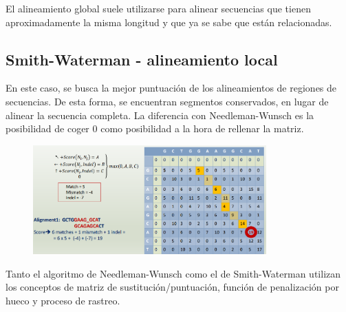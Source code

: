 El alineamiento global suele utilizarse para alinear secuencias que tienen aproximadamente la misma longitud y que ya se sabe que están relacionadas.

\subsection{Smith-Waterman - alineamiento local}
En este caso, se busca la mejor puntuación de los alineamientos de regiones de secuencias. De esta forma, se encuentran segmentos conservados, en lugar de alinear la secuencia completa. La diferencia con Needleman-Wunsch es la posibilidad de coger 0 como posibilidad a la hora de rellenar la matriz.

\begin{figure}[h]
\centering
\includegraphics[width = 0.8\textwidth]{figs/smith-waterman.png}
\end{figure}

Tanto el algoritmo de Needleman-Wunsch como el de Smith-Waterman utilizan los conceptos de matriz de sustitución/puntuación, función de penalización por hueco y proceso de rastreo. 

